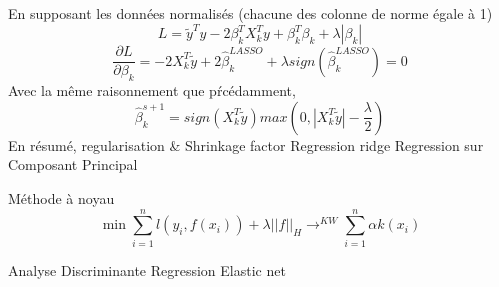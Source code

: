 \documentclass{article}
\begin{document}
En supposant les donn\'ees normalis\'es (chacune des colonne de norme \'egale \`a 1)
\begin{equation}
L=\tilde{y}^Ty-2\beta_k^TX^T_ky+\beta_k^T\beta_k+\lambda|\beta_k|
\end{equation}
\begin{equation}
\frac{\partial L}{\partial \beta_k}=-2X_k^T\tilde{y}+2\hat{\beta}_k^{LASSO}+\lambda sign(\hat{\beta}_k^{LASSO})=0
\end{equation}
Avec la m\^eme raisonnement que p\'rc\'edamment,
\begin{equation}
\hat{\beta}_k^{s+1}=sign (X_k^T\tilde{y})max(0,|X^T_k\tilde{y}|-\frac{\lambda}{2})
\end{equation}
En r\'esum\'e, regularisation \& Shrinkage factor
Regression ridge
Regression sur Composant Principal

M\'ethode \`a noyau
\begin{equation}
\min \sum_{i=1}^nl(y_i,f(x_i))+\lambda ||f||_H\to^{KW} \sum_{i=1}^n \alpha k(x_i)
\end{equation}

Analyse Discriminante
Regression Elastic net
\end{document}
